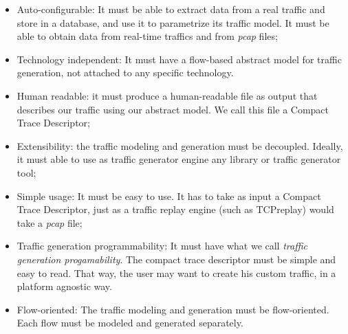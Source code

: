 \begin{itemize}
	
	\item Auto-configurable: It must be able to extract data from a real traffic and store in a database, and use it to parametrize its traffic model. It must be able to obtain data from real-time traffics and from \textit{pcap} files;
	
	\item Technology independent: It must have a flow-based abstract model for traffic generation, not attached to any specific technology.
	
	\item Human readable: it must produce a human-readable file as output that describes our traffic using our abstract model. We call this file a Compact Trace Descriptor;
	
	\item Extensibility: the traffic modeling and generation must be decoupled. Ideally, it must able to use as traffic generator engine any library or traffic generator tool;
	
	\item Simple usage: It must be easy to use. It has to take as input a Compact Trace Descriptor, just as a traffic replay engine (such as TCPreplay) would take a \textit{pcap} file;
	
	\item Traffic generation programmability: It must have what we call \textit{traffic generation progamability}. The compact trace descriptor must be simple and easy to read. That way, the user may want to create his custom traffic, in a platform agnostic way. %
	
	\item Flow-oriented: The traffic modeling and generation must be flow-oriented. Each flow must be modeled and generated separately.
	
\end{itemize}









